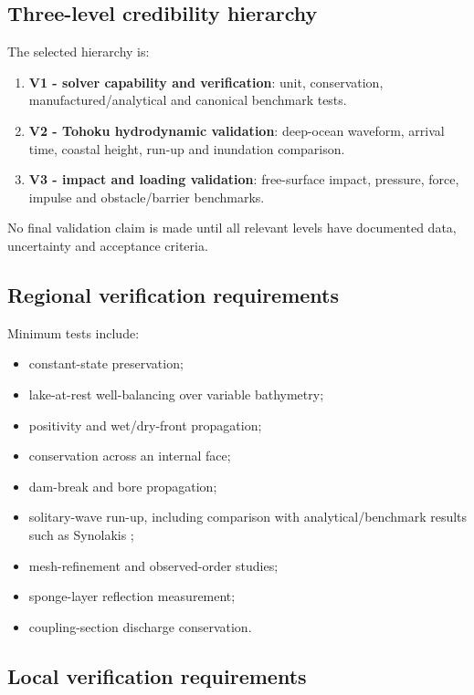 \documentclass[11pt,a4paper]{article}
\begin{document}
\subsection{Three-level credibility hierarchy}

The selected hierarchy is:
\begin{enumerate}
  \item \textbf{V1 - solver capability and verification}: unit, conservation, manufactured/analytical and canonical benchmark tests.
  \item \textbf{V2 - Tohoku hydrodynamic validation}: deep-ocean waveform, arrival time, coastal height, run-up and inundation comparison.
  \item \textbf{V3 - impact and loading validation}: free-surface impact, pressure, force, impulse and obstacle/barrier benchmarks.
\end{enumerate}
No final validation claim is made until all relevant levels have documented data, uncertainty and acceptance criteria.

\subsection{Regional verification requirements}

Minimum tests include:
\begin{itemize}
  \item constant-state preservation;
  \item lake-at-rest well-balancing over variable bathymetry;
  \item positivity and wet/dry-front propagation;
  \item conservation across an internal face;
  \item dam-break and bore propagation;
  \item solitary-wave run-up, including comparison with analytical/benchmark results such as Synolakis \cite{synolakis1987};
  \item mesh-refinement and observed-order studies;
  \item sponge-layer reflection measurement;
  \item coupling-section discharge conservation.
\end{itemize}

\subsection{Local verification requirements}
\end{document}
